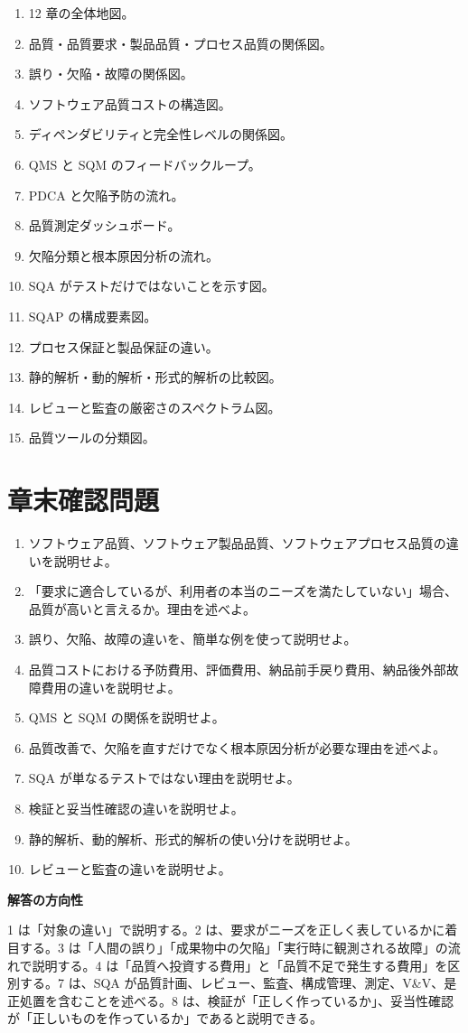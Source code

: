 \documentclass[11pt,a4paper]{article}
\begin{document}
\begin{enumerate}
  \item 12 章の全体地図。
  \item 品質・品質要求・製品品質・プロセス品質の関係図。
  \item 誤り・欠陥・故障の関係図。
  \item ソフトウェア品質コストの構造図。
  \item ディペンダビリティと完全性レベルの関係図。
  \item QMS と SQM のフィードバックループ。
  \item PDCA と欠陥予防の流れ。
  \item 品質測定ダッシュボード。
  \item 欠陥分類と根本原因分析の流れ。
  \item SQA がテストだけではないことを示す図。
  \item SQAP の構成要素図。
  \item プロセス保証と製品保証の違い。
  \item 静的解析・動的解析・形式的解析の比較図。
  \item レビューと監査の厳密さのスペクトラム図。
  \item 品質ツールの分類図。
\end{enumerate}

\section{章末確認問題}
\begin{enumerate}
  \item ソフトウェア品質、ソフトウェア製品品質、ソフトウェアプロセス品質の違いを説明せよ。
  \item 「要求に適合しているが、利用者の本当のニーズを満たしていない」場合、品質が高いと言えるか。理由を述べよ。
  \item 誤り、欠陥、故障の違いを、簡単な例を使って説明せよ。
  \item 品質コストにおける予防費用、評価費用、納品前手戻り費用、納品後外部故障費用の違いを説明せよ。
  \item QMS と SQM の関係を説明せよ。
  \item 品質改善で、欠陥を直すだけでなく根本原因分析が必要な理由を述べよ。
  \item SQA が単なるテストではない理由を説明せよ。
  \item 検証と妥当性確認の違いを説明せよ。
  \item 静的解析、動的解析、形式的解析の使い分けを説明せよ。
  \item レビューと監査の違いを説明せよ。
\end{enumerate}

\begin{claimbox}
\textbf{解答の方向性}\par
1 は「対象の違い」で説明する。2 は、要求がニーズを正しく表しているかに着目する。3 は「人間の誤り」「成果物中の欠陥」「実行時に観測される故障」の流れで説明する。4 は「品質へ投資する費用」と「品質不足で発生する費用」を区別する。7 は、SQA が品質計画、レビュー、監査、構成管理、測定、V\&V、是正処置を含むことを述べる。8 は、検証が「正しく作っているか」、妥当性確認が「正しいものを作っているか」であると説明できる。
\end{claimbox}
\end{document}
